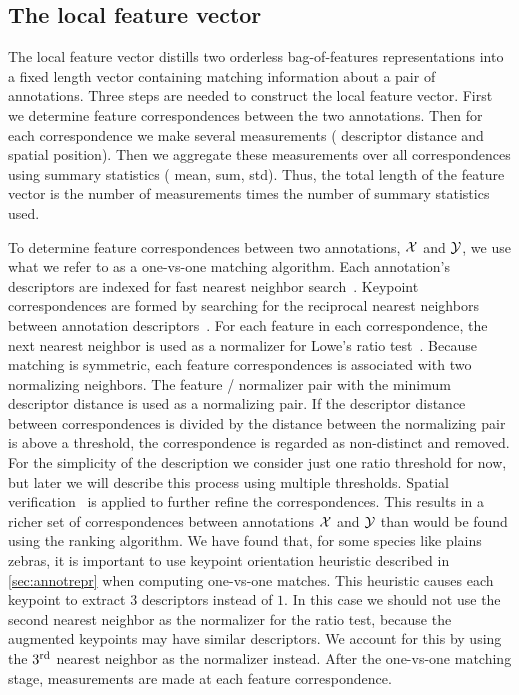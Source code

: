 \subsection{The local feature vector}
The local feature vector distills two orderless bag-of-features representations into a fixed length vector
  containing matching information about a pair of annotations.
Three steps are needed to construct the local feature vector.
First we determine feature correspondences between the two annotations.
Then for each correspondence we make several measurements (\eg{} descriptor distance and spatial position).
Then we aggregate these measurements over all correspondences using summary statistics (\eg{} mean, sum, std).
Thus, the total length of the feature vector is the number of measurements times the number of summary statistics
  used.

To determine feature correspondences between two annotations, $\mathcal{X}$ and $\mathcal{Y}$, we use what we refer to as a
  one-vs-one matching algorithm.
Each annotation's descriptors are indexed for fast nearest neighbor search~\cite{muja_fast_2009}.
Keypoint correspondences are formed by searching for the reciprocal nearest neighbors between annotation
  descriptors~\cite{qin_hello_2011}.
For each feature in each correspondence, the next nearest neighbor is used as a normalizer for Lowe's ratio
  test~\cite{lowe_distinctive_2004}.
Because matching is symmetric, each feature correspondences is associated with two normalizing neighbors.
The feature / normalizer pair with the minimum descriptor distance is used as a normalizing pair.
If the descriptor distance between correspondences is divided by the distance between the normalizing pair is
  above a threshold, the correspondence is regarded as non-distinct and removed.
For the simplicity of the description we consider just one ratio threshold for now, but later we will describe
  this process using multiple thresholds.
Spatial verification~\cite{philbin_object_2007} is applied to further refine the correspondences.
This results in a richer set of correspondences between annotations $\mathcal{X}$ and $\mathcal{Y}$ than would be found using
  the ranking algorithm.
We have found that, for some species like plains zebras, it is important to use keypoint orientation heuristic
  described in \cref{sec:annotrepr} when computing one-vs-one matches.
This heuristic causes each keypoint to extract $3$ descriptors instead of $1$.
In this case we should not use the second nearest neighbor as the normalizer for the ratio test, because the
  augmented keypoints may have similar descriptors.
We account for this by using the $3^{\textrm{rd}}$ nearest neighbor as the normalizer instead.
After the one-vs-one matching stage, measurements are made at each feature correspondence.

